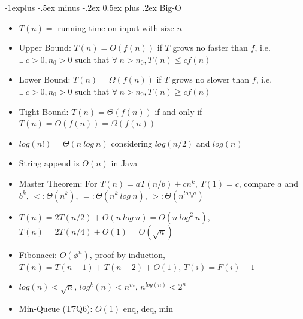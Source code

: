 \documentclass[10pt, landscape]{article}
\makeatletter
\renewcommand{\section}{\@startsection{section}{1}{0mm}%
                                {-1ex plus -.5ex minus -.2ex}%
                                {0.5ex plus .2ex}%
                                {\normalfont\large\bfseries}}
\renewcommand{\section}{\@startsection{section}{2}{0mm}%
                                {-1explus -.5ex minus -.2ex}%
                                {0.5ex plus .2ex}%
                                {\normalfont\normalsize\bfseries}}
\makeatother
\begin{document}
\raggedright
\footnotesize
\begin{multicols*}{4}

\setlength{\columnseprule}{0.25pt}
\setlength{\premulticols}{1pt}
\setlength{\postmulticols}{1pt}
\setlength{\multicolsep}{1pt}
\setlength{\columnsep}{2pt}

\begin{center}
\end{center}

\section{Big-O}
\begin{itemize}
    \item $T(n)=$ running time on input with size $n$
    \item Upper Bound: $T(n)=O(f(n))$ if $T$ grows no faster than $f$, i.e. $\exists\ c > 0, n_0 > 0$ such that $\forall \ n > n_0, T(n) \leq cf(n)$
    \item Lower Bound: $T(n)=\Omega(f(n))$ if $T$ grows no slower than $f$, i.e. $\exists\ c > 0, n_0 > 0$ such that $\forall \ n > n_0, T(n) \geq cf(n)$
    \item Tight Bound: $T(n)=\Theta(f(n))$ if and only if $T(n)=O(f(n))=\Omega(f(n))$
    \item $log(n!)=\Theta(n\ log\ n)$ considering $log(n/2)$ and $log(n)$
    \item String append is $O(n)$ in Java
    \item Master Theorem: For $T(n)=aT(n/b)+cn^k$, $T(1)=c$, compare $a$ and $b^k$, $<: \Theta(n^k)$, $=:\Theta(n^k \ log \ n)$, $>: \Theta(n^{log_ba})$
    \item $T(n)=2T(n/2)+O(n\ log \ n)=O(n\ log^2\ n)$, $T(n)=2T(n/4)+O(1)=O(\sqrt{n})$
    \item Fibonacci: $O(\phi^n)$, proof by induction, $T(n)=T(n-1)+T(n-2)+O(1)$, $T(i)=F(i)-1$
    \item $log(n)<\sqrt{n}$, $log^k(n)<n^m$, $n^{log(n)}<2^n$
    \item Min-Queue (T7Q6): $O(1)$ enq, deq, min
\end{itemize}


\end{multicols*}
\end{document}

